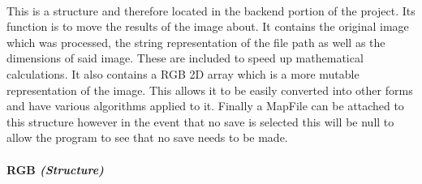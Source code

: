\begin{FlushLeft}
    \begin{figure}[H]
        \centering
    \end{figure}\\

    This is a structure and therefore located in the backend portion of the project. Its function is to move the results of the image about. It contains the original image which was processed, the string representation of the file path as well as the dimensions of said image. These are included to speed up mathematical calculations. It also contains a RGB 2D array which is a more mutable representation of the image. This allows it to be easily converted into other forms and have various algorithms applied to it. Finally a MapFile can be attached to this structure however in the event that no save is selected this will be null to allow the program to see that no save needs to be made.\\

    \bk

    \pagebreak
\paragraph{RGB \textit{(Structure)}} \mbox{} \\

    \begin{figure}[H]
        \centering
    \end{figure}\\


\end{FlushLeft}
